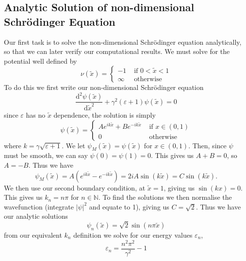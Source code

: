 \documentclass{article}
\theoremstyle{definition}
\theoremstyle{remark}
\begin{document}
\subsection{Analytic Solution of non-dimensional Schr\"{o}dinger Equation}
Our first task is to solve the non-dimensional Schr\"{o}dinger equation analytically, so that we can later verify our computational results. We must solve for the potential well defined by
\begin{equation}
    \nu(\tilde{x}) = 
        \begin{cases}
            -1 & \text{ if } 0<\tilde{x}<1\\
            \infty & \text{ otherwise}
        \end{cases}
\end{equation}
To do this we first write our non-dimensional Schr\"{o}dinger equation
\begin{equation}
    \frac{\mathrm{d}^2\psi(\tilde{x})}{\mathrm{d}\tilde{x}^2} + \gamma^2(\varepsilon+1)\psi(\tilde{x}) = 0
\end{equation}
since $\varepsilon$ has no $\tilde{x}$ dependence, the solution is simply 
\begin{equation}
    \psi(\tilde{x}) = 
        \begin{cases}
            Ae^{ik\tilde{x}} + Be^{-ik\tilde{x}} & \text{ if }x\in(0,1)\\
            0 & \text{ otherwise}
        \end{cases}
\end{equation}
where $k = \gamma\sqrt{\varepsilon+1}$. We let $\psi_M(\tilde{x}) = \psi(\tilde{x})$ for $x\in (0,1)$. Then, since $\psi$ must be smooth, we can say $\psi(0)=\psi(1)=0$. This gives us $A+B=0$, so $A=-B$. Thus we have
\begin{equation}
    \psi_M(\tilde{x}) = A(e^{ik\tilde{x}}-e^{-ik\tilde{x}}) = 2iA\sin(k\tilde{x}) = C\sin(k\tilde{x}).
\end{equation}
We then use our second boundary condition, at $\tilde{x}=1$, giving us $\sin(kx) = 0$. This gives us $k_n = n\pi$ for $n\in\mathbb{N}$. To find the solutions we then normalise the wavefunction (integrate $|\psi|^2$ and equate to 1), giving us $C=\sqrt{2}$. Thus we have our analytic solutions
\begin{equation}
    \psi_n(\tilde{x}) = \sqrt{2}\sin(n\pi\tilde{x})
\end{equation}
from our equivalent $k_n$ definition we solve for our energy values $\varepsilon_n$,
\begin{equation}
    \varepsilon_n = \frac{n^2\pi^2}{\gamma^2}-1
\end{equation}
\end{document}
